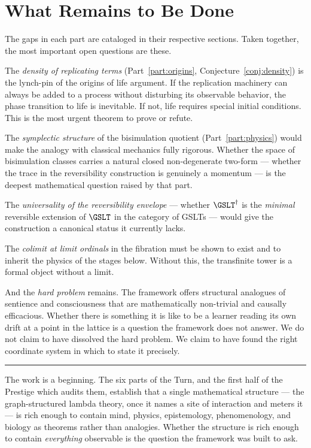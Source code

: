 \chapter*{What Remains to Be Done}

The gaps in each part are cataloged in their respective sections.
Taken together, the most important open questions are these.

The \emph{density of replicating terms}
(Part~\ref{part:origins}, Conjecture~\ref{conj:density}) is
the lynch-pin of the origins of life argument.
If the replication machinery can always be added to a process
without disturbing its observable behavior, the phase transition
to life is inevitable.
If not, life requires special initial conditions.
This is the most urgent theorem to prove or refute.

The \emph{symplectic structure} of the bisimulation quotient
(Part~\ref{part:physics}) would make the analogy with classical
mechanics fully
rigorous.
Whether the space of bisimulation classes carries a natural
closed non-degenerate two-form --- whether the trace in the
reversibility construction is genuinely a momentum --- is the
deepest mathematical question raised by that part.

The \emph{universality of the reversibility envelope} --- whether
$\GSLT^\dagger$ is the \emph{minimal} reversible extension of
$\GSLT$ in the category of GSLTs --- would give the construction
a canonical status it currently lacks.

The \emph{colimit at limit ordinals} in the fibration must be
shown to exist and to inherit the physics of the stages below.
Without this, the transfinite tower is a formal object without
a limit.

And the \emph{hard problem} remains.
The framework offers structural analogues of sentience and
consciousness that are mathematically non-trivial and causally
efficacious.
Whether there is something it is like to be a learner reading its
own drift at a point in the lattice is a question the framework
does not answer.
We do not claim to have dissolved the hard problem.
We claim to have found the right coordinate system in which to
state it precisely.

\vspace{2em}
\noindent\hrule
\vspace{1em}

\noindent
The work is a beginning.
The six parts of the Turn, and the first half of the Prestige which
audits them, establish that a single mathematical structure --- the
graph-structured lambda theory, once it names a site of interaction and
meters it --- is rich enough to contain mind, physics, epistemology,
phenomenology, and biology as theorems rather than analogies.
Whether the structure is rich enough to contain \emph{everything}
observable is the question the framework was built to ask.
